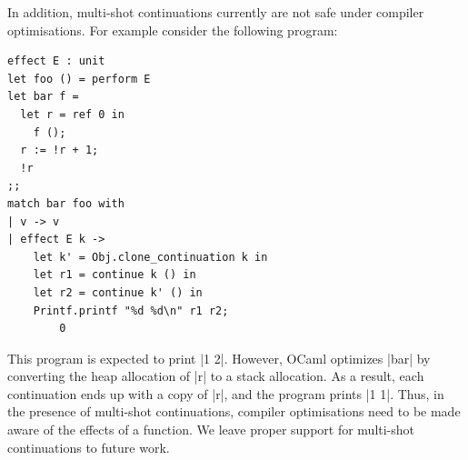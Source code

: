 \documentclass[sigplan,10pt,review,anonymous]{acmart}\settopmatter{printfolios=true,printccs=false,printacmref=false}
\begin{document}
In addition, multi-shot continuations currently are not safe under compiler
optimisations. For example consider the following program:

\begin{minipage}{\linewidth}
\begin{lstlisting}
effect E : unit
let foo () = perform E
let bar f =
  let r = ref 0 in
	f ();
  r := !r + 1;
  !r
;;
match bar foo with
| v -> v
| effect E k ->
    let k' = Obj.clone_continuation k in
    let r1 = continue k () in
    let r2 = continue k' () in
    Printf.printf "%d %d\n" r1 r2;
		0
\end{lstlisting}
\end{minipage}

This program is expected to print |1 2|. However, OCaml optimizes |bar| by
converting the heap allocation of |r| to a stack allocation. As a result, each
continuation ends up with a copy of |r|, and the program prints |1 1|. Thus, in
the presence of multi-shot continuations, compiler optimisations need to be
made aware of the effects of a function. We leave proper support for multi-shot
continuations to future work.
\end{document}
